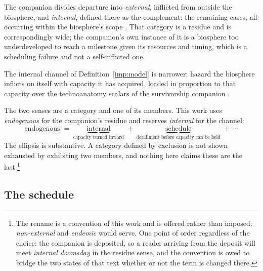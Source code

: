 \begin{convention}\label{sch:conv:internal}
The companion divides departure into \emph{external}, inflicted from
outside the biosphere, and \emph{internal}, defined there as the
complement: the remaining cases, all occurring within the biosphere's
scope \cite{Nexus}. That category is a residue and is correspondingly
wide; the companion's own instance of it is a biosphere too
underdeveloped to reach a milestone given its resources and timing,
which is a scheduling failure and not a self-inflicted one.

The internal channel of Definition~\ref{imp:model} is narrower: hazard the
biosphere inflicts on itself with capacity it has acquired, loaded in
proportion to that capacity over the technoanatomy scalars of
the survivorship companion \cite{GoldenSurvivorship}.

The two senses are a category and one of its members. This work uses
\emph{endogenous} for the companion's residue and reserves
\emph{internal} for the channel:
\begin{equation}\label{sch:eq:partition}
\text{endogenous}\;=\;\underbrace{\text{internal}}_{\text{capacity
turned inward}}\;+\;\underbrace{\text{schedule}}_{\text{derailment
before capacity can be held}}\;+\;\cdots
\end{equation}
The ellipsis is substantive. A category defined by exclusion is not
shown exhausted by exhibiting two members, and nothing here claims these
are the last.\footnote{The rename is a convention of this work and is
offered rather than imposed; \emph{non-external} and \emph{endemic}
would serve. One point of order regardless of the choice: the companion
is deposited, so a reader arriving from the deposit will meet
\emph{internal doomsday} in the residue sense, and the convention is
owed to bridge the two states of that text whether or not the term is
changed there.}
\end{convention}

\subsection{The schedule}\label{sch:subsub:model}

